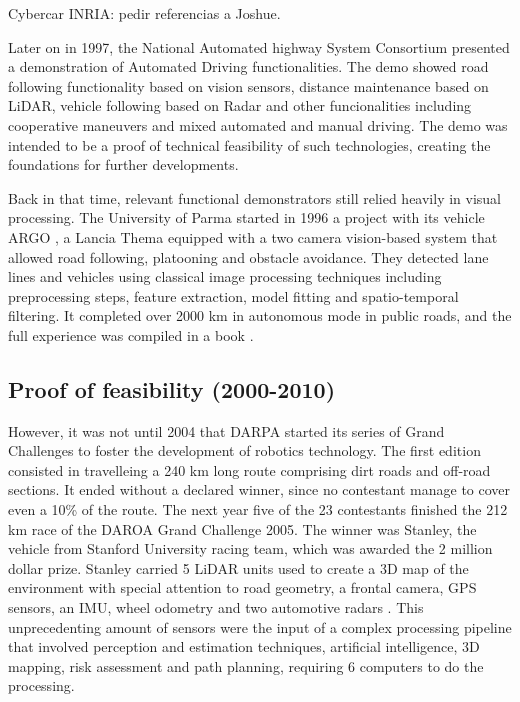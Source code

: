 Cybercar INRIA: pedir referencias a Joshue.

Later on in 1997, the National Automated highway System Consortium presented a 
demonstration of Automated Driving functionalities\cite{Thorpe1997}. 
The demo showed road following functionality based on vision sensors, 
distance maintenance based on LiDAR, vehicle following based on Radar
and other funcionalities including cooperative maneuvers and mixed automated 
and manual driving. 
The demo was intended to be a proof of technical feasibility of such 
technologies, creating the foundations for further developments.

Back in that time, relevant functional demonstrators still relied
heavily in visual processing. The University of Parma started in 1996 a
project with its vehicle ARGO \cite{Broggi1998}, a Lancia Thema equipped with 
a two camera vision-based system that allowed road following, platooning and 
obstacle avoidance. They detected lane lines and vehicles using classical image 
processing techniques including preprocessing steps, feature extraction,
model fitting and spatio-temporal filtering.
It completed over 2000 km in autonomous mode in public roads, and the 
full experience was compiled in a book \cite{Broggi1999}.


\subsection{Proof of feasibility (2000-2010)}

However, it was not until 2004 that DARPA started its series of Grand Challenges
to foster the development of robotics technology. 
The first edition consisted in travelleing a 240 km long route comprising dirt 
roads and off-road sections. It ended without a declared winner, since no 
contestant manage to cover even a 10\% of the route.
The next year five of the 23 contestants finished the 212 km race of the 
DAROA Grand Challenge 2005. 
The winner was Stanley, the vehicle from Stanford University racing team, which 
was awarded the 2 million dollar prize.
Stanley carried 5 LiDAR units used to create a 3D map of the environment with 
special attention to road geometry, a frontal camera, GPS sensors, an IMU, 
wheel odometry and two automotive radars \cite{Thrun2006}. This unprecedenting
amount of sensors were the input of a complex processing pipeline that involved 
perception and estimation techniques, artificial intelligence, 3D mapping, risk 
assessment and path planning, requiring 6 computers to do the processing.

